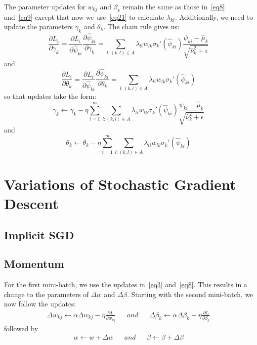 \documentclass[11pt]{article}
\begin{document}
The parameter updates for $w_{kj}$ and $\beta_k$ remain the same as those in~\eqref{eq8} and~\eqref{eq9} except that now we use~\eqref{eq21} to calculate $\lambda_{ki}$.
Additionally, we need to update the parameters $\gamma_k$ and $\theta_k$. The chain rule gives us:
\begin{equation}
\frac{\partial L_i}{\partial \gamma_k} = \frac{\partial L_i}{\partial \widehat{\psi}_{ki}} \frac{\partial \widehat{\psi}_{ki}}{\partial \gamma_k}
= \sum_{l:\left(k,l\right) \in A} \lambda_{li} w_{lk} \sigma_k' \left( \widehat{\psi}_{ki} \right) \frac{\psi_{ki} - \widehat{\mu}_k}{\sqrt{\widehat{\nu}_k^2 + \epsilon}}
\end{equation}
and
\begin{equation}
\frac{\partial L_i}{\partial \theta_k} = \frac{\partial L_i}{\partial \widehat{\psi}_{ki}} \frac{\partial \widehat{\psi}_{ki}}{\partial \theta_k}
= \sum_{l:\left(k,l\right) \in A} \lambda_{li} w_{lk} \sigma_k' \left( \widehat{\psi}_{ki} \right)
\end{equation}
so that updates take the form:
\begin{equation}
\gamma_k \leftarrow \gamma_k - \eta \sum_{i=1}^m \sum_{l:\left(k,l\right) \in A} \lambda_{li} w_{lk} \sigma_k' \left( \widehat{\psi}_{ki} \right) \frac{\psi_{ki} - \widehat{\mu}_k}{\sqrt{\widehat{\nu}_k^2 + \epsilon}}
\end{equation}
and
\begin{equation}
\theta_k \leftarrow \theta_k - \eta \sum_{i=1}^m \sum_{l:\left(k,l\right) \in A} \lambda_{li} w_{lk} \sigma_k' \left( \widehat{\psi}_{ki} \right)
\end{equation}

\section{Variations of Stochastic Gradient Descent}
\subsection{Implicit SGD}
\subsection{Momentum}
For the first mini-batch, we use the updates in~\eqref{eq3} and~\eqref{eq8}. This results in a change to the parameters of $\Delta w$ and $\Delta \beta$.
Starting with the second mini-batch, we now follow the updates:
\begin{align}
\Delta w_{kj} \leftarrow \alpha \Delta w_{kj} - \eta \frac{\partial L}{\partial w_{kj}} && and && \Delta \beta_k \leftarrow \alpha \Delta \beta_k - \eta \frac{\partial L}{\partial \beta_k}
\end{align}
followed by
\begin{align}
w \leftarrow w + \Delta w && and && \beta \leftarrow \beta + \Delta \beta
\end{align}
\end{document}
